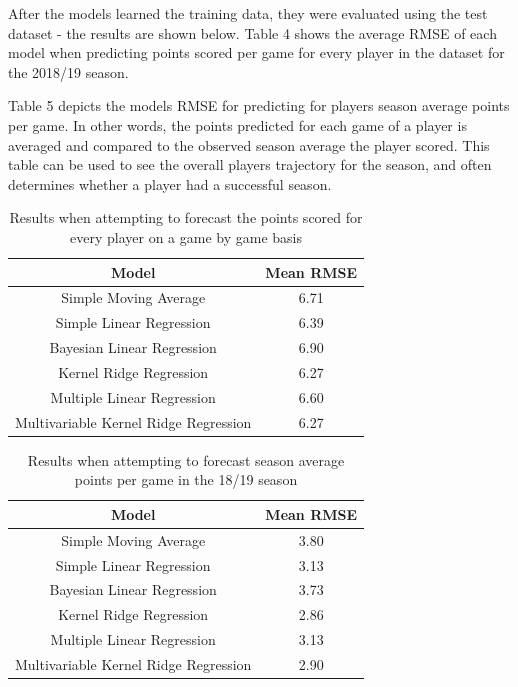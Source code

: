 \documentclass[a4paper,11pt,twoside]{article}
\begin{document}
After the models learned the training data, they were evaluated using the test dataset - the results are shown below. Table 4 shows the average RMSE of each model when predicting points scored per game for every player in the dataset for the 2018/19 season.

Table 5 depicts the models RMSE for predicting for players season average points per game. In other words, the points predicted for each game of a player is averaged and compared to the observed season average the player scored. This table can be used to see the overall players trajectory for the season, and often determines whether a player had a successful season.
\vspace{5mm}
\begin{table} [h!]
\captionsetup{justification=centering}
\begin{center}
\begin{tabular}{ |c|c|} 
 \hline
 \textbf{Model} & \textbf{Mean RMSE}\\ 
 \hline
 Simple Moving Average &  6.71\\ 
 \hline
 Simple Linear Regression &  6.39\\ 
 \hline
 Bayesian Linear Regression& 6.90\\
 \hline
 Kernel Ridge Regression& 6.27\\
 \hline
 Multiple Linear Regression& 6.60\\
 \hline
 Multivariable Kernel Ridge Regression & 6.27\\
 \hline
\end{tabular}
\end{center}
\caption{Results when attempting to forecast the points scored for every player on a game by game basis}
\end{table}

\begin{table}[h!]
\captionsetup{justification=centering}
\begin{center}
\begin{tabular}{ |c|c|} 
 \hline
     \textbf{Model} & \textbf{Mean RMSE}\\ 
 \hline
 Simple Moving Average  & 3.80\\ 
 \hline
 Simple Linear Regression & 3.13\\ 
 \hline
 Bayesian Linear Regression  & 3.73 \\
 \hline
 Kernel Ridge Regression  & 2.86\\
 \hline
 Multiple Linear Regression& 3.13\\
 \hline
 Multivariable Kernel Ridge Regression  & 2.90\\
 \hline
\end{tabular}
\end{center}
\caption{Results when attempting to forecast season average points per game in the 18/19 season}
\end{table}
\end{document}
